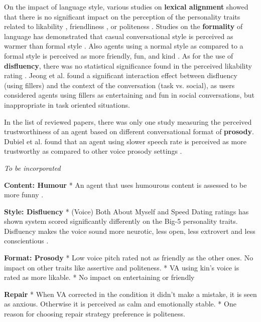On the impact of language style, various studies on \textbf{lexical alignment} showed that there is no significant impact on the perception of the personality traits related to likability \cite{huiyang2022improving}\cmt{[17]}\cite{linnemann2018can}\cmt{[15]}, friendliness \cite{spillner2021talk}\cmt{[18]}, or politeness \cite{spillner2021talk}\cmt{[18]}. Studies on the \textbf{formality} of language has demonstrated that casual conversational style is perceived as warmer than formal style \cite{cox2022does}\cmt{[27]}. Also agents using a normal style as compared to a formal style is perceived as more friendly, fun, and kind \cite{ouchi2019should}\cmt{[59]}. As for the use of \textbf{disfluency}, there was no statistical significance found in the perceived likability rating \cite{jeong2019exploring}\cmt{[10]}\cite{pfeifer2009should}\cmt{[12]}. Jeong et al. \cite{jeong2019exploring} found a significant interaction effect between disfluency (using fillers) and the context of the conversation (task vs. social), as users considered agents using fillers as entertaining and fun in social conversations, but inappropriate in task oriented situations.

In the list of reviewed papers, there was only one study measuring the perceived trustworthiness of an agent based on different conversational format of \textbf{prosody}. Dubiel et al. found that an agent using slower speech rate is perceived as more trustworthy as compared to other voice prosody settings \cite{dubiel2020persuasive}\cmt{[60]}.

\textit{To be incorporated}

\textbf{Content: Humour}
* An agent that uses humourous content is assessed to be more funny \cite{khooshabeh2011does}\cmt{[37]}.

\textbf{Style: Disfluency}
* (Voice) Both About Myself and Speed Dating ratings has shown system scored significantly differently on the Big-5 personality traits. Disfluency makes the voice sound more neurotic, less open, less extrovert and less conscientious \cite{wester2015artificial}\cmt{[14]}.

\textbf{Format: Prosody}
* Low voice pitch rated not as friendly as the other ones. No impact on other traits like assertive and politeness. \cite{tolmeijer2021female}\cmt{[62]}
* VA using kin's voice is rated as more likable. \cite{chan2021kinvoices}\cmt{[74]}
* No impact on entertaining or friendly  \cite{jestin2022effects}\cmt{[81]}

\textbf{Repair}
* When VA corrected in the condition it didn't make a mistake, it is seen as anxious. Otherwise it is perceived as calm and emotionally stable. \cite{cuadra2021my}\cmt{[67]}
* One reason for choosing repair strategy preference is politeness. \cite{ashktorab2019resilient}\cmt{[88]}

